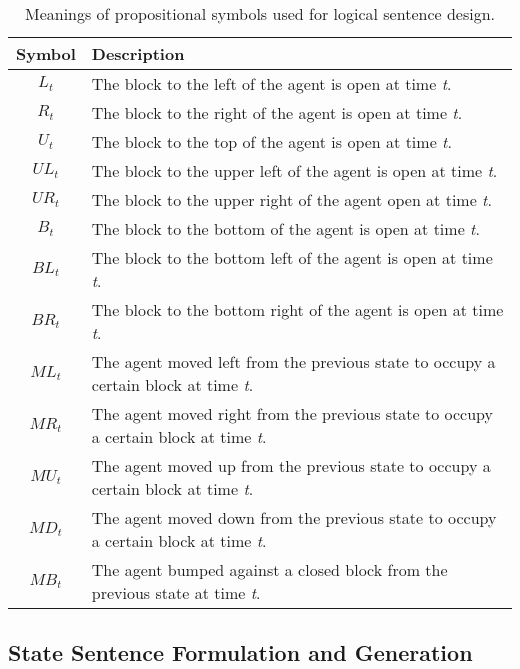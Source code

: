 \begin{table}[H]
  \begin{center}
    
    \begin{tabular}{c|l}
    
      \textbf{Symbol} & \textbf{Description} \\ 
      \hline
      $L_t$ & The block to the left of the agent is open at time \textit{t}. \\ 
      $R_t$ & The block to the right of the agent is open at time \textit{t}. \\  
      $U_t$ & The block to the top of the agent is open at time \textit{t}. \\   
      ${UL}_t$ & The block to the upper left of the agent is open at time \textit{t}. \\  
      ${UR}_t$ & The block to the upper right of the agent open at time \textit{t}. \\  
      $B_t$ & The block to the bottom of the agent is open at time \textit{t}. \\  
      ${BL}_t$ & The block to the bottom left of the agent is open at time \textit{t}. \\  
      ${BR}_t$ & The block to the bottom right of the agent is open at time \textit{t}. \\    
      ${ML}_t$ & The agent moved left from the previous state to occupy a certain block at time \textit{t}.\\ 
      ${MR}_t$ & The agent moved right from the previous state to occupy a certain block at time \textit{t}.\\ 
      ${MU}_t$ & The agent moved up from the previous state to occupy a certain block at time \textit{t}.\\  
      ${MD}_t$ & The agent moved down from the previous state to occupy a certain block at time \textit{t}.\\  
      ${MB}_t$ & The agent bumped against a closed block from the previous state at time \textit{t}.
    \end{tabular}
  \end{center}
\caption{Meanings of propositional symbols used for logical sentence design.}
\end{table}
\label{table:symbol_description}



\subsection{State Sentence Formulation and Generation}

